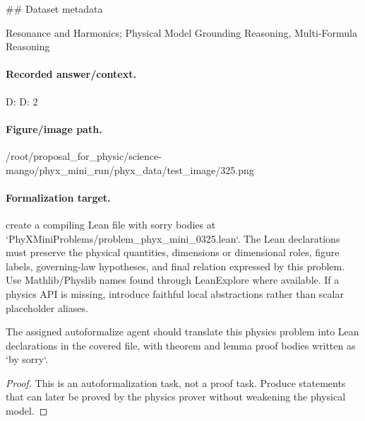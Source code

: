 \#\# Dataset metadata

Resonance and Harmonics; Physical Model Grounding Reasoning, Multi-Formula Reasoning

\paragraph{Recorded answer/context.}
D: D: 2

\paragraph{Figure/image path.}
/root/proposal\_for\_physic/science-mango/phyx\_mini\_run/phyx\_data/test\_image/325.png

\paragraph{Formalization target.}
create a compiling Lean file with sorry bodies at `PhyXMiniProblems/problem\_phyx\_mini\_0325.lean`. The Lean declarations must preserve the physical quantities, dimensions or dimensional roles, figure labels, governing-law hypotheses, and final relation expressed by this problem.
Use Mathlib/Physlib names found through LeanExplore where available. If a physics API is missing, introduce faithful local abstractions rather than scalar placeholder aliases.

\begin{theorem}
\label{thm:physics:phyx_mini_0325:target}
The assigned autoformalize agent should translate this physics problem into Lean declarations in the covered file, with theorem and lemma proof bodies written as `by sorry`.
\end{theorem}
\begin{proof}
This is an autoformalization task, not a proof task. Produce statements that can later be proved by the physics prover without weakening the physical model.
\end{proof}

